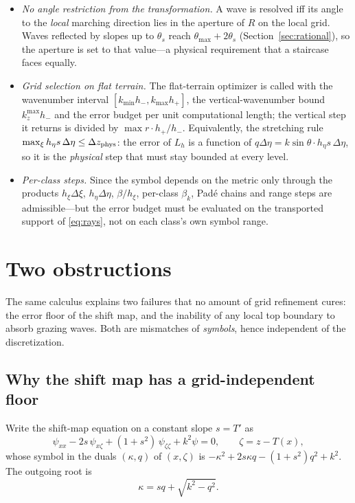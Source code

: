 \documentclass[11pt]{article}
\begin{document}
\begin{itemize}
\item \emph{No angle restriction from the transformation.} A wave is resolved
  iff its angle to the \emph{local} marching direction lies in the aperture
  of $R$ on the local grid. Waves reflected by slopes up to $\theta_s$ reach
  $\theta_{\max}+2\theta_s$ (Section~\ref{sec:rational}), so the aperture is
  set to that value---a physical requirement that a staircase faces equally.
\item \emph{Grid selection on flat terrain.} The flat-terrain optimizer
  \cite{lytaev2020iccsa,lytaev2026nmp} is called with the wavenumber interval
  $[k_{\min}h_-,k_{\max}h_+]$, the vertical-wavenumber bound $k_z^{\max}h_-$
  and the error budget per unit computational length; the vertical step it
  returns is divided by $\max r\cdot h_+/h_-$. Equivalently, the stretching
  rule $\max_\xi h_\eta s\,\Delta\eta\le\Delta z_{\rm phys}$: the error of
  $L_h$ is a function of $q\Delta\eta=k\sin\theta\cdot h_\eta s\,\Delta\eta$,
  so it is the \emph{physical} step that must stay bounded at every level.
\item \emph{Per-class steps.} Since the symbol depends on the metric only
  through the products $h_\xi\Delta\xi$, $h_\eta\Delta\eta$, $\beta/h_\xi$,
  per-class $\beta_k$, Pad\'e chains and range steps are admissible---but the
  error budget must be evaluated on the transported support of
  \eqref{eq:rays}, not on each class's own symbol range.
\end{itemize}

\section{Two obstructions}\label{sec:obstructions}

The same calculus explains two failures that no amount of grid refinement
cures: the error floor of the shift map, and the inability of any local top
boundary to absorb grazing waves. Both are mismatches of \emph{symbols}, hence
independent of the discretization.

\subsection{Why the shift map has a grid-independent floor}\label{sec:shift}

Write the shift-map equation on a constant slope $s=T'$ as
\begin{equation}\label{eq:shiftmap}
\psi_{xx}-2s\,\psi_{x\zeta}+(1+s^2)\,\psi_{\zeta\zeta}+k^2\psi=0,
\qquad \zeta=z-T(x),
\end{equation}
whose symbol in the duals $(\kappa,q)$ of $(x,\zeta)$ is
$-\kappa^2+2s\kappa q-(1+s^2)q^2+k^2$. The outgoing root is
\begin{equation}\label{eq:shiftroot}
\kappa=sq+\sqrt{k^2-q^2} .
\end{equation}
\end{document}
